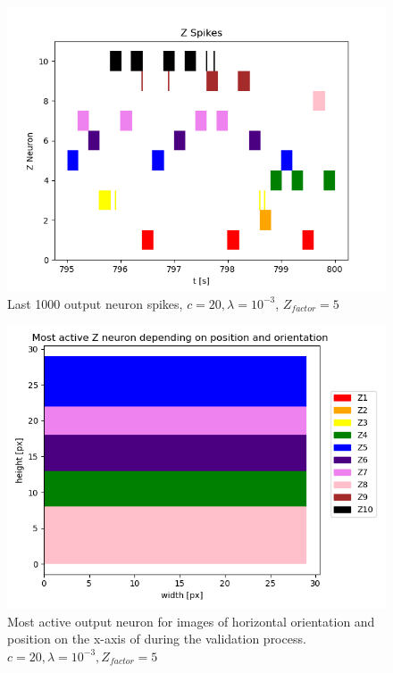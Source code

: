 \begin{figure}
  \includegraphics[width=\linewidth]{figures/horvert/horvert_c20_3_Zfactor5_1000LastZSpikes.png}
  \caption{Last 1000 output neuron spikes, $c = 20, \lambda = 10^{-3}$, $Z_{factor} = 5$}
  \label{fig:horvertLastSpikes}
\end{figure}

\begin{figure}
  \includegraphics[width=\linewidth]{figures/horvert/horvert_c20_3_Zfactor5_horizontalLines.png}
  \caption{Most active output neuron for images of horizontal orientation and position on the x-axis of during the validation process. $c = 20, \lambda = 10^{-3}, Z_{factor} = 5$}
  \label{fig:horvert_c20_3_Zfactor5_horizontalLines}
\end{figure}

